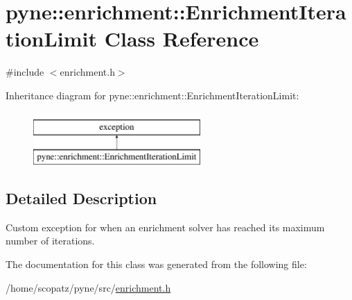 \hypertarget{classpyne_1_1enrichment_1_1_enrichment_iteration_limit}{\section{pyne\-:\-:enrichment\-:\-:Enrichment\-Iteration\-Limit Class Reference}
\label{classpyne_1_1enrichment_1_1_enrichment_iteration_limit}
}


{\ttfamily \#include $<$enrichment.\-h$>$}

Inheritance diagram for pyne\-:\-:enrichment\-:\-:Enrichment\-Iteration\-Limit\-:\begin{figure}[H]
\begin{center}
\leavevmode
\includegraphics[height=2.000000cm]{classpyne_1_1enrichment_1_1_enrichment_iteration_limit}
\end{center}
\end{figure}


\subsection{Detailed Description}
Custom exception for when an enrichment solver has reached its maximum number of iterations. 

The documentation for this class was generated from the following file\-:\begin{DoxyCompactItemize}
\item 
/home/scopatz/pyne/src/\hyperlink{enrichment_8h}{enrichment.\-h}\end{DoxyCompactItemize}
